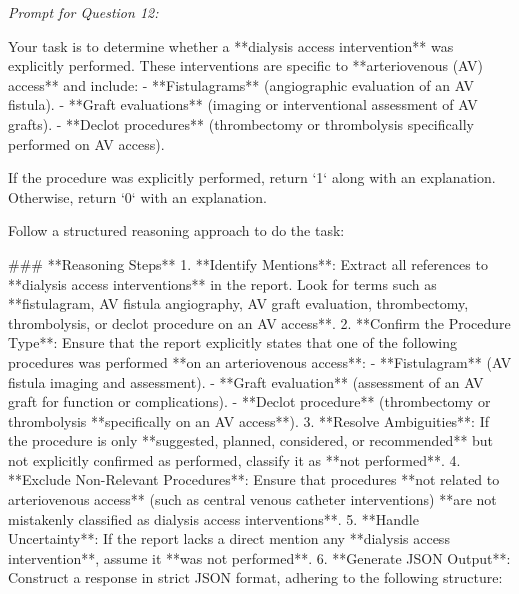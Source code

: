 \textit{\normalsize Prompt for Question  12:}
\begin{mdframed}[]
\normalsize

Your task is to determine whether a **dialysis access intervention** was explicitly performed. These interventions are specific to **arteriovenous (AV) access** and include:  
- **Fistulagrams** (angiographic evaluation of an AV fistula).  
- **Graft evaluations** (imaging or interventional assessment of AV grafts).  
- **Declot procedures** (thrombectomy or thrombolysis specifically performed on AV access).  

If the procedure was explicitly performed, return `1` along with an explanation. Otherwise, return `0` with an explanation.

Follow a structured reasoning approach to do the task:

### **Reasoning Steps**  
1. **Identify Mentions**: Extract all references to **dialysis access interventions** in the report. Look for terms such as **fistulagram, AV fistula angiography, AV graft evaluation, thrombectomy, thrombolysis, or declot procedure on an AV access**.  
2. **Confirm the Procedure Type**: Ensure that the report explicitly states that one of the following procedures was performed **on an arteriovenous access**:  
   - **Fistulagram** (AV fistula imaging and assessment).  
   - **Graft evaluation** (assessment of an AV graft for function or complications).  
   - **Declot procedure** (thrombectomy or thrombolysis **specifically on an AV access**).  
3. **Resolve Ambiguities**: If the procedure is only **suggested, planned, considered, or recommended** but not explicitly confirmed as performed, classify it as **not performed**.  
4. **Exclude Non-Relevant Procedures**: Ensure that procedures **not related to arteriovenous access** (such as central venous catheter interventions) **are not mistakenly classified as dialysis access interventions**.  
5. **Handle Uncertainty**: If the report lacks a direct mention any **dialysis access intervention**, assume it **was not performed**.  
6. **Generate JSON Output**: Construct a response in strict JSON format, adhering to the following structure:  

\end{mdframed}

